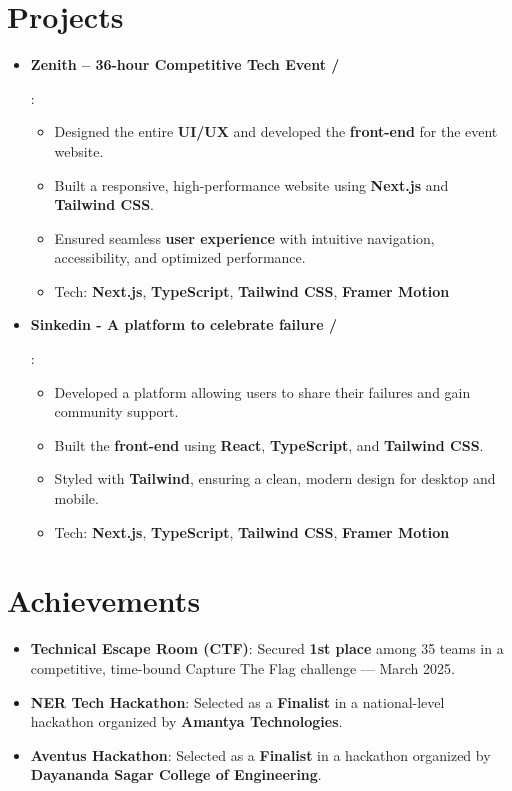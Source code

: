 \documentclass[a4paper,20pt]{article}
\newcommand{\resumeItem}[2]{
  \item\small{
    \textbf{#1}{: #2 \vspace{-2pt}}
  }
}
\newcommand{\resumeSubItem}[2]{\resumeItem{#1}{#2}\vspace{-3pt}}
\newcommand{\resumeSubHeadingListStart}{\begin{itemize}[leftmargin=*]}
\newcommand{\resumeSubHeadingListEnd}{\end{itemize}}
\begin{document}
\vspace{-5pt}
\section{Projects}
\resumeSubHeadingListStart
\vspace{2pt}
\resumeSubItem{Zenith – 36-hour Competitive Tech Event  
\href{https://github.com/pbdsce/zenith}{\color{blue}{GitHub}}/\href{https://zenith.pointblank.club}{\color{blue}{Deployment}}} {
    \begin{itemize}
        \item Designed the entire \textbf{UI/UX} and developed the \textbf{front-end} for the event website.  
        \item Built a responsive, high-performance website using \textbf{Next.js} and \textbf{Tailwind CSS}.  
        \item Ensured seamless \textbf{user experience} with intuitive navigation, accessibility, and optimized performance.  
        \item Tech: \textbf{Next.js}, \textbf{TypeScript}, \textbf{Tailwind CSS}, \textbf{Framer Motion} 
    \end{itemize}
    }

\resumeSubItem{Sinkedin - A platform to celebrate failure  \href{https://github.com/rudrakshass/Sinkedin}{\color{blue}{GitHub}}/\href{https://sinkedin.xyz}{\color{blue}{Deployment}}} {
    \begin{itemize}
        \item Developed a platform allowing users to share their failures and gain community support.
        \item Built the \textbf{front-end} using \textbf{React}, \textbf{TypeScript}, and \textbf{Tailwind CSS}.
        \item Styled with \textbf{Tailwind}, ensuring a clean, modern design for desktop and mobile.
        \item Tech: \textbf{Next.js}, \textbf{TypeScript}, \textbf{Tailwind CSS}, \textbf{Framer Motion}
    \end{itemize}
}

\resumeSubHeadingListEnd

\vspace{5pt}
\section{Achievements}
\resumeSubHeadingListStart
  \resumeSubItem{Technical Escape Room (CTF)}{Secured \textbf{1st place} among 35 teams in a competitive, time-bound Capture The Flag challenge — March 2025.}
  \resumeSubItem{NER Tech Hackathon}{Selected as a \textbf{Finalist} in a national-level hackathon organized by \textbf{Amantya Technologies}.}
  \resumeSubItem{Aventus Hackathon}{Selected as a \textbf{Finalist} in a hackathon organized by \textbf{Dayananda Sagar College of Engineering}.}
\resumeSubHeadingListEnd
\end{document}
